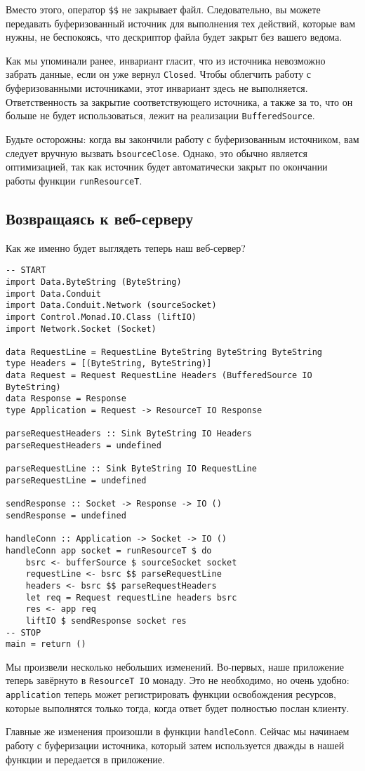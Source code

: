 Вместо этого, оператор \verb#$$# не закрывает файл. Следовательно, вы можете 
передавать буферизованный источник для выполнения тех действий, которые вам 
нужны, не беспокоясь, что дескриптор файла будет закрыт без вашего ведома.

\begin{remark}
Как мы упоминали ранее, инвариант гласит, что из источника невозможно забрать 
данные, если он уже вернул \lstinline{Closed}. Чтобы облегчить работу с буферизованными 
источниками, этот инвариант здесь не выполняется. Ответственность за закрытие 
соответствующего источника, а также за то, что он больше не будет использоваться,
лежит на реализации \lstinline'BufferedSource'.
\end{remark}

Будьте осторожны: когда вы закончили работу с буферизованным источником, вам 
следует вручную вызвать \lstinline'bsourceClose'. Однако, это обычно является 
оптимизацией, так как источник будет автоматически закрыт по окончании 
работы функции \lstinline'runResourceT'.

\subsection{Возвращаясь к веб-серверу}
Как же именно будет выглядеть теперь наш веб-сервер?
\begin{lstlisting}
-- START
import Data.ByteString (ByteString)
import Data.Conduit
import Data.Conduit.Network (sourceSocket)
import Control.Monad.IO.Class (liftIO)
import Network.Socket (Socket)

data RequestLine = RequestLine ByteString ByteString ByteString
type Headers = [(ByteString, ByteString)]
data Request = Request RequestLine Headers (BufferedSource IO ByteString)
data Response = Response
type Application = Request -> ResourceT IO Response

parseRequestHeaders :: Sink ByteString IO Headers
parseRequestHeaders = undefined

parseRequestLine :: Sink ByteString IO RequestLine
parseRequestLine = undefined

sendResponse :: Socket -> Response -> IO ()
sendResponse = undefined

handleConn :: Application -> Socket -> IO ()
handleConn app socket = runResourceT $ do
    bsrc <- bufferSource $ sourceSocket socket
    requestLine <- bsrc $$ parseRequestLine
    headers <- bsrc $$ parseRequestHeaders
    let req = Request requestLine headers bsrc
    res <- app req
    liftIO $ sendResponse socket res
-- STOP
main = return ()
\end{lstlisting}

Мы произвели несколько небольших изменений. Во-первых, наше приложение теперь завёрнуто в 
\lstinline=ResourceT IO= монаду. Это не необходимо, но очень удобно:
\lstinline{application} теперь может регистрировать функции освобождения ресурсов,
которые выполнятся только тогда, когда ответ будет полностью послан клиенту.

Главные же изменения произошли в функции \lstinline=handleConn=. Сейчас мы начинаем работу
с буферизации источника, который затем используется дважды в нашей функции и передается в
приложение.

